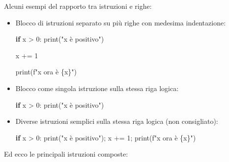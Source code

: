 \documentclass[
  letterpaper,
]{scrbook}
\newenvironment{Shaded}{\begin{snugshade}}{\end{snugshade}}
\newcommand{\BuiltInTok}[1]{\textcolor[rgb]{0.00,0.23,0.31}{#1}}
\newcommand{\ControlFlowTok}[1]{\textcolor[rgb]{0.00,0.23,0.31}{\textbf{#1}}}
\newcommand{\DecValTok}[1]{\textcolor[rgb]{0.68,0.00,0.00}{#1}}
\newcommand{\NormalTok}[1]{\textcolor[rgb]{0.00,0.23,0.31}{#1}}
\newcommand{\OperatorTok}[1]{\textcolor[rgb]{0.37,0.37,0.37}{#1}}
\newcommand{\SpecialCharTok}[1]{\textcolor[rgb]{0.37,0.37,0.37}{#1}}
\newcommand{\SpecialStringTok}[1]{\textcolor[rgb]{0.13,0.47,0.30}{#1}}
\newcommand{\StringTok}[1]{\textcolor[rgb]{0.13,0.47,0.30}{#1}}
\begin{document}
Alcuni esempi del rapporto tra istruzioni e righe:

\begin{itemize}
\item
  Blocco di istruzioni separato su più righe con medesima indentazione:

\begin{Shaded}
\begin{Highlighting}[]
\ControlFlowTok{if}\NormalTok{ x }\OperatorTok{\textgreater{}} \DecValTok{0}\NormalTok{:}
  \BuiltInTok{print}\NormalTok{(}\StringTok{"x è positivo"}\NormalTok{)}

\NormalTok{  x }\OperatorTok{+=} \DecValTok{1}

  \BuiltInTok{print}\NormalTok{(}\SpecialStringTok{f"x ora è }\SpecialCharTok{\{}\NormalTok{x}\SpecialCharTok{\}}\SpecialStringTok{"}\NormalTok{)}
\end{Highlighting}
\end{Shaded}
\item
  Blocco come singola istruzione sulla stessa riga logica:

\begin{Shaded}
\begin{Highlighting}[]
\ControlFlowTok{if}\NormalTok{ x }\OperatorTok{\textgreater{}} \DecValTok{0}\NormalTok{: }\BuiltInTok{print}\NormalTok{(}\StringTok{"x è positivo"}\NormalTok{)}
\end{Highlighting}
\end{Shaded}
\item
  Diverse istruzioni semplici sulla stessa riga logica (non
  consigliato):

\begin{Shaded}
\begin{Highlighting}[]
\ControlFlowTok{if}\NormalTok{ x }\OperatorTok{\textgreater{}} \DecValTok{0}\NormalTok{: }\BuiltInTok{print}\NormalTok{(}\StringTok{"x è positivo"}\NormalTok{)}\OperatorTok{;}\NormalTok{ x }\OperatorTok{+=} \DecValTok{1}\OperatorTok{;} \BuiltInTok{print}\NormalTok{(}\SpecialStringTok{f"x ora è }\SpecialCharTok{\{}\NormalTok{x}\SpecialCharTok{\}}\SpecialStringTok{"}\NormalTok{)}
\end{Highlighting}
\end{Shaded}
\end{itemize}

Ed ecco le principali istruzioni composte:
\end{document}
